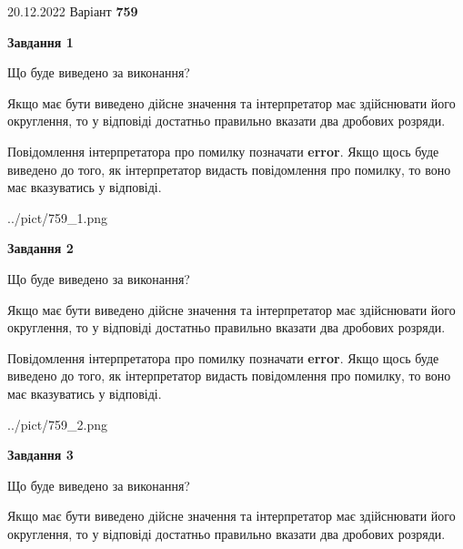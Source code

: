 \documentclass[12pt, ukrainian]{article}
\begin{document}
{20.12.2022 Варіант \No \textbf { 759 }\par}
{
\begin {Large}

{\begin {center}\textbf{Завдання 1}\end {center}}\par
Що буде виведено за виконання? \par

Якщо має бути виведено дійсне значення та інтерпретатор має здійснювати його округлення, 
то у відповіді достатньо правильно вказати два дробових розряди.

Повідомлення інтерпретатора про помилку позначати \textbf{error}.
Якщо щось буде виведено до того, як інтерпретатор видасть повідомлення про помилку, 
то воно має вказуватись у відповіді. \par

\begin{center}
	{../pict/759_1.png}
\end{center}
\newpage

{\begin {center}\textbf{Завдання 2}\end {center}}\par
Що буде виведено за виконання? \par

Якщо має бути виведено дійсне значення та інтерпретатор має здійснювати його округлення, 
то у відповіді достатньо правильно вказати два дробових розряди.

Повідомлення інтерпретатора про помилку позначати \textbf{error}.
Якщо щось буде виведено до того, як інтерпретатор видасть повідомлення про помилку, 
то воно має вказуватись у відповіді. \par

\begin{center}
	{../pict/759_2.png}
\end{center}
\newpage

{\begin {center}\textbf{Завдання 3}\end {center}}\par
Що буде виведено за виконання? \par

Якщо має бути виведено дійсне значення та інтерпретатор має здійснювати його округлення, 
то у відповіді достатньо правильно вказати два дробових розряди.


\end{Large}}
\end{document}
